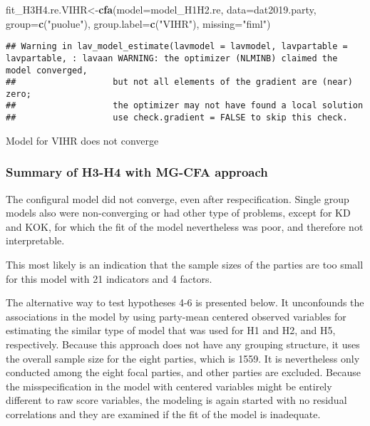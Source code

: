 \documentclass[
]{article}
\newenvironment{Shaded}{\begin{snugshade}}{\end{snugshade}}
\newcommand{\DataTypeTok}[1]{\textcolor[rgb]{0.13,0.29,0.53}{#1}}
\newcommand{\KeywordTok}[1]{\textcolor[rgb]{0.13,0.29,0.53}{\textbf{#1}}}
\newcommand{\NormalTok}[1]{#1}
\newcommand{\StringTok}[1]{\textcolor[rgb]{0.31,0.60,0.02}{#1}}
\begin{document}
\begin{Shaded}
\begin{Highlighting}[]
\NormalTok{fit_H3H4.re.VIHR<-}\KeywordTok{cfa}\NormalTok{(}\DataTypeTok{model=}\NormalTok{model_H1H2.re,}
                    \DataTypeTok{data=}\NormalTok{dat2019.party,}
                    \DataTypeTok{group=}\KeywordTok{c}\NormalTok{(}\StringTok{"puolue"}\NormalTok{),}
                    \DataTypeTok{group.label=}\KeywordTok{c}\NormalTok{(}\StringTok{"VIHR"}\NormalTok{),}
                    \DataTypeTok{missing=}\StringTok{"fiml"}\NormalTok{)}
\end{Highlighting}
\end{Shaded}

\begin{verbatim}
## Warning in lav_model_estimate(lavmodel = lavmodel, lavpartable = lavpartable, : lavaan WARNING: the optimizer (NLMINB) claimed the model converged,
##                   but not all elements of the gradient are (near) zero;
##                   the optimizer may not have found a local solution
##                   use check.gradient = FALSE to skip this check.
\end{verbatim}

Model for VIHR does not converge

\newpage

\hypertarget{summary-of-h3-h4-with-mg-cfa-approach}{%
\subsubsection{Summary of H3-H4 with MG-CFA
approach}\label{summary-of-h3-h4-with-mg-cfa-approach}}

The configural model did not converge, even after respecification.
Single group models also were non-converging or had other type of
problems, except for KD and KOK, for which the fit of the model
nevertheless was poor, and therefore not interpretable.

This most likely is an indication that the sample sizes of the parties
are too small for this model with 21 indicators and 4 factors.

The alternative way to test hypotheses 4-6 is presented below. It
unconfounds the associations in the model by using party-mean centered
observed variables for estimating the similar type of model that was
used for H1 and H2, and H5, respectively. Because this approach does not
have any grouping structure, it uses the overall sample size for the
eight parties, which is 1559. It is nevertheless only conducted among
the eight focal parties, and other parties are excluded. Because the
misspecification in the model with centered variables might be entirely
different to raw score variables, the modeling is again started with no
residual correlations and they are examined if the fit of the model is
inadequate.
\end{document}
